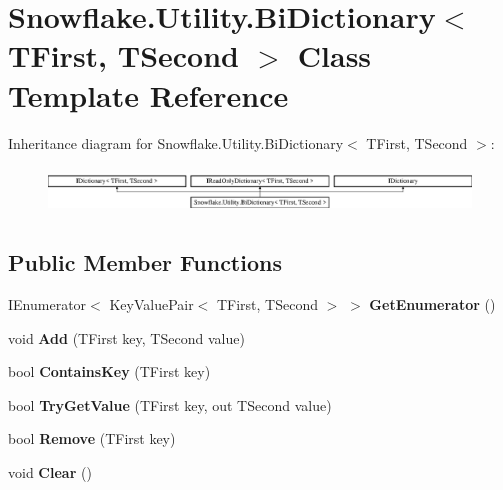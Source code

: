 \hypertarget{class_snowflake_1_1_utility_1_1_bi_dictionary}{}\section{Snowflake.\+Utility.\+Bi\+Dictionary$<$ T\+First, T\+Second $>$ Class Template Reference}
\label{class_snowflake_1_1_utility_1_1_bi_dictionary}
Inheritance diagram for Snowflake.\+Utility.\+Bi\+Dictionary$<$ T\+First, T\+Second $>$\+:\begin{figure}[H]
\begin{center}
\leavevmode
\includegraphics[height=1.244444cm]{class_snowflake_1_1_utility_1_1_bi_dictionary}
\end{center}
\end{figure}
\subsection*{Public Member Functions}
\begin{DoxyCompactItemize}
\item 
\hypertarget{class_snowflake_1_1_utility_1_1_bi_dictionary_ac27cee9bee531be61f24e309875175ea}{}I\+Enumerator$<$ Key\+Value\+Pair$<$ T\+First, T\+Second $>$ $>$ {\bfseries Get\+Enumerator} ()\label{class_snowflake_1_1_utility_1_1_bi_dictionary_ac27cee9bee531be61f24e309875175ea}

\item 
\hypertarget{class_snowflake_1_1_utility_1_1_bi_dictionary_a5355a5a441236c690e09cd3ad9c486ee}{}void {\bfseries Add} (T\+First key, T\+Second value)\label{class_snowflake_1_1_utility_1_1_bi_dictionary_a5355a5a441236c690e09cd3ad9c486ee}

\item 
\hypertarget{class_snowflake_1_1_utility_1_1_bi_dictionary_abc385c341737849597557988e0964459}{}bool {\bfseries Contains\+Key} (T\+First key)\label{class_snowflake_1_1_utility_1_1_bi_dictionary_abc385c341737849597557988e0964459}

\item 
\hypertarget{class_snowflake_1_1_utility_1_1_bi_dictionary_a43f67acac646a57bcf8f3b4d73b0c96d}{}bool {\bfseries Try\+Get\+Value} (T\+First key, out T\+Second value)\label{class_snowflake_1_1_utility_1_1_bi_dictionary_a43f67acac646a57bcf8f3b4d73b0c96d}

\item 
\hypertarget{class_snowflake_1_1_utility_1_1_bi_dictionary_a0189b2ea0bc2e9ec6d63bb8467e2b345}{}bool {\bfseries Remove} (T\+First key)\label{class_snowflake_1_1_utility_1_1_bi_dictionary_a0189b2ea0bc2e9ec6d63bb8467e2b345}

\item 
\hypertarget{class_snowflake_1_1_utility_1_1_bi_dictionary_a856eda45fe6978a3396260f296bd8c3d}{}void {\bfseries Clear} ()\label{class_snowflake_1_1_utility_1_1_bi_dictionary_a856eda45fe6978a3396260f296bd8c3d}

\end{DoxyCompactItemize}
